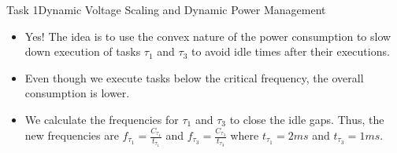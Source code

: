 \begin{frame}{Task 1}{Dynamic Voltage Scaling and Dynamic Power Management}
    \begin{solutionnoinc}
        \begin{itemize}
            \item Yes! The idea is to use the convex nature of the power consumption to slow down execution of tasks $\tau_1$ and $\tau_3$ to avoid idle times after their executions.
            \item Even though we execute tasks below the critical frequency, the overall consumption is lower.
            \item We calculate the frequencies for $\tau_1$ and $\tau_3$ to close the idle gaps. Thus, the new frequencies are $f_{\tau_1} = \frac{C_{\tau_1}}{t_{\tau_1}}$ and $f_{\tau_3} = \frac{C_{\tau_3}}{t_{\tau_3}}$ where $t_{\tau_1} = 2ms$ and $t_{\tau_3} = 1ms$.
        \end{itemize}
    \end{solutionnoinc}
\end{frame}

